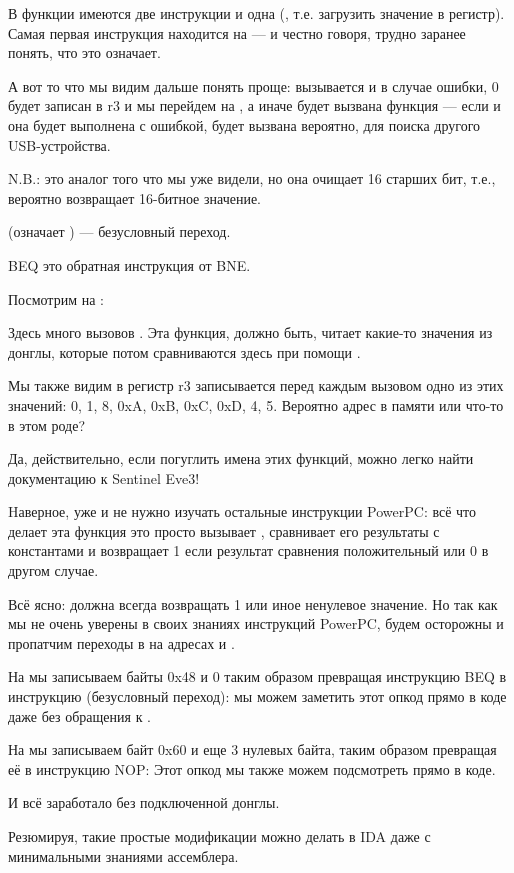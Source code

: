 В функции имеются две инструкции  
и одна  
(, т.е. загрузить значение в регистр).
Самая первая инструкция находится на 
 --- и честно говоря, трудно заранее понять, что это означает.

А вот то что мы видим дальше понять проще: 
вызывается  и в случае ошибки, 0 будет записан в r3
и мы перейдем на , а иначе будет вызвана функция  --- если и она будет
выполнена с ошибкой, будет вызвана
 вероятно, для поиска другого USB-устройства.

N.B.:  это аналог того что мы уже видели, но она очищает 16 старших бит,
т.е., \\
 вероятно возвращает 16-битное значение.

 (означает ) --- безусловный переход.

\ac{BEQ} это обратная инструкция от \ac{BNE}.

Посмотрим на :



Здесь много вызовов . 
Эта функция, должно быть, читает какие-то значения из донглы, которые потом сравниваются здесь при помощи .

Мы также видим в регистр r3 записывается перед каждым вызовом  
одно из этих значений: 0, 1, 8, 0xA, 0xB, 0xC, 0xD, 4, 5.
Вероятно адрес в памяти или что-то в этом роде?

Да, действительно, если погуглить имена этих функций, можно легко найти документацию к Sentinel Eve3!

Hаверное, уже и не нужно изучать остальные инструкции PowerPC: всё что делает эта функция это просто
вызывает , сравнивает его результаты с константами и возвращает 1 если результат сравнения положительный или 0 в другом случае.

Всё ясно:  должна всегда возвращать 1 или иное ненулевое значение.
Но так как мы не очень уверены в своих знаниях инструкций PowerPC, будем осторожны и пропатчим переходы в  на адресах
 и .

На  мы записываем байты 0x48 и 0 таким образом превращая инструкцию \ac{BEQ} 
в инструкцию  (безусловный переход):
мы можем заметить этот опкод прямо в коде даже без обращения к \PPC.

На  мы записываем байт 0x60 и еще 3 нулевых байта,
таким образом превращая её в инструкцию
\ac{NOP}:
Этот опкод мы также можем подсмотреть прямо в коде.

И всё заработало без подключенной донглы.

Резюмируя, такие простые модификации можно делать в \ac{IDA} даже с минимальными знаниями
ассемблера.


